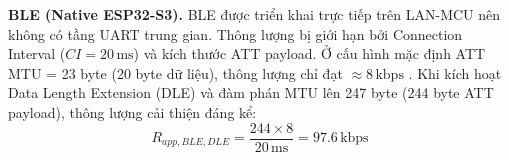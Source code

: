         \textbf{BLE (Native ESP32-S3).} BLE được triển khai trực tiếp trên LAN-MCU nên không có tầng UART trung gian. Thông lượng bị giới hạn bởi Connection Interval ($CI = 20\,\text{ms}$) và kích thước ATT payload. Ở cấu hình mặc định ATT MTU = 23 byte (20 byte dữ liệu), thông lượng chỉ đạt $\approx 8\,\text{kbps}$ \cite{bluetooth_core_v5}. Khi kích hoạt Data Length Extension (DLE) và đàm phán MTU lên 247 byte (244 byte ATT payload), thông lượng cải thiện đáng kể:
        \[ R_{app,BLE,DLE} = \frac{244 \times 8}{20\,\text{ms}} = 97{.}6\,\text{kbps} \]
    